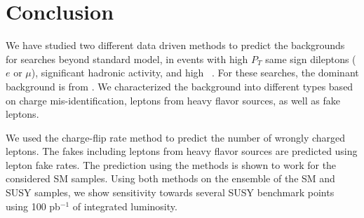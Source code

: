\section{Conclusion}
\label{sec:conclusion}
We have studied two different data driven methods to predict the backgrounds for  
searches beyond standard model, in events with high $P_T$ same sign dileptons
($e$ or $\mu$), significant hadronic activity, and high \met~. 
For these searches, the dominant background is from \ttbar. We characterized
the background into different types based on charge mis-identification,
leptons from heavy flavor sources, as well as fake leptons.

We used the charge-flip rate method to predict the number of wrongly charged 
leptons. The fakes including leptons from heavy flavor sources are predicted 
using lepton fake rates. The prediction using the methods is shown to work 
for the considered SM samples. Using both methods on the ensemble of the
SM and SUSY samples, we show sensitivity towards several SUSY benchmark 
points using 100 pb$^{-1}$ of integrated luminosity. 



